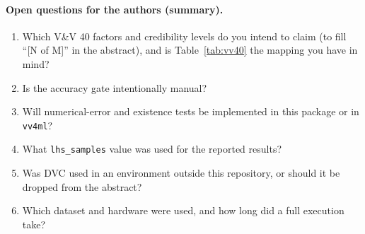 \paragraph{Open questions for the authors (summary).}
\begin{enumerate}
  \item Which V\&V 40 factors and credibility levels do you intend to claim
    (to fill ``[N of M]'' in the abstract), and is Table~\ref{tab:vv40} the
    mapping you have in mind?
  \item Is the accuracy gate intentionally manual?
  \item Will numerical-error and existence tests be implemented in this
    package or in \texttt{vv4ml}?
  \item What \texttt{lhs\_samples} value was used for the reported results?
  \item Was DVC used in an environment outside this repository, or should it
    be dropped from the abstract?
  \item Which dataset and hardware were used, and how long did a full
    execution take?
\end{enumerate}
